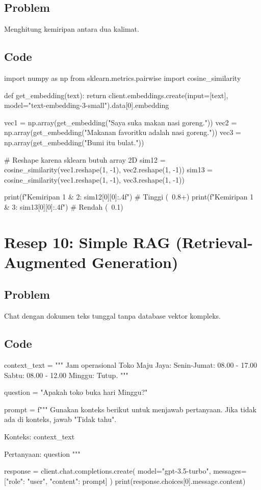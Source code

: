 \subsection*{Problem}
Menghitung kemiripan antara dua kalimat.

\subsection*{Code}
\begin{codeblock}[language=Python]
import numpy as np
from sklearn.metrics.pairwise import cosine_similarity

def get_embedding(text):
    return client.embeddings.create(input=[text], model="text-embedding-3-small").data[0].embedding

vec1 = np.array(get_embedding("Saya suka makan nasi goreng."))
vec2 = np.array(get_embedding("Makanan favoritku adalah nasi goreng."))
vec3 = np.array(get_embedding("Bumi itu bulat."))

# Reshape karena sklearn butuh array 2D
sim12 = cosine_similarity(vec1.reshape(1, -1), vec2.reshape(1, -1))
sim13 = cosine_similarity(vec1.reshape(1, -1), vec3.reshape(1, -1))

print(f"Kemiripan 1 & 2: {sim12[0][0]:.4f}") # Tinggi (~0.8+)
print(f"Kemiripan 1 & 3: {sim13[0][0]:.4f}") # Rendah (~0.1)
\end{codeblock}

\section{Resep 10: Simple RAG (Retrieval-Augmented Generation)}

\subsection*{Problem}
Chat dengan dokumen teks tunggal tanpa database vektor kompleks.

\subsection*{Code}
\begin{codeblock}[language=Python]
context_text = """
Jam operasional Toko Maju Jaya:
Senin-Jumat: 08.00 - 17.00
Sabtu: 08.00 - 12.00
Minggu: Tutup.
"""

question = "Apakah toko buka hari Minggu?"

prompt = f"""
Gunakan konteks berikut untuk menjawab pertanyaan. Jika tidak ada di konteks, jawab "Tidak tahu".

Konteks:
{context_text}

Pertanyaan: {question}
"""

response = client.chat.completions.create(
    model="gpt-3.5-turbo",
    messages=[{"role": "user", "content": prompt}]
)
print(response.choices[0].message.content)
\end{codeblock}

